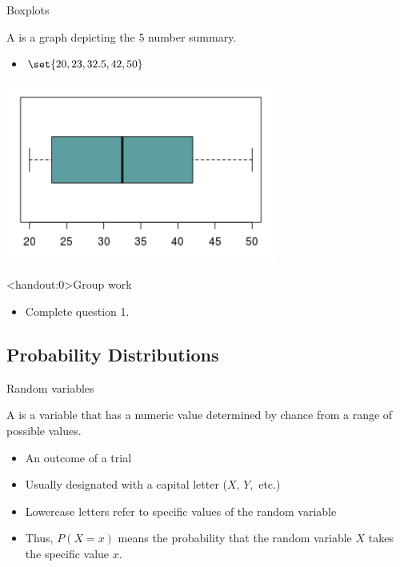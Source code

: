 \documentclass[xcolor=table, aspectratio=169, bigger]{beamer}
\begin{document}
\begin{frame}{Boxplots}
\begin{block}{}
A  is a graph depicting the 5 number summary.
\begin{itemize}
\item $\set{20,  23, 32.5, 42, 50}$
\end{itemize}
\end{block}
{\centering
\includegraphics[width=3.5in]{../images/wk05_boxplot}\par
}
\end{frame}


\begin{frame}<handout:0>{Group work}
\begin{block}{}
\large
\begin{itemize}
\item Complete question 1.
\end{itemize}
\end{block}
\end{frame}



%
%
\subsection{Probability Distributions}

\begin{frame}{Random variables}
\begin{block}{}
A  is a variable that has a numeric value determined by chance from a range of possible values.

\begin{itemize}
\pause\item An outcome of a trial
\pause\item Usually designated with a capital letter ($X, \, Y,$ etc.)
\pause\item Lowercase letters refer to specific values of the random variable
\pause\item Thus, $P(X=x)$ means the probability that the random variable $X$ takes the specific value $x$.
\end{itemize}
\end{block}
\end{frame}
\end{document}

